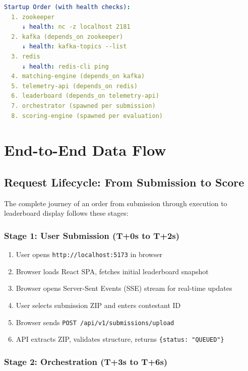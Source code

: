 \documentclass[10pt,a4paper,oneside]{report}
\begin{document}
\begin{lstlisting}[language=yaml]
Startup Order (with health checks):
  1. zookeeper
     ↓ health: nc -z localhost 2181
  2. kafka (depends_on zookeeper)
     ↓ health: kafka-topics --list
  3. redis
     ↓ health: redis-cli ping
  4. matching-engine (depends_on kafka)
  5. telemetry-api (depends_on redis)
  6. leaderboard (depends_on telemetry-api)
  7. orchestrator (spawned per submission)
  8. scoring-engine (spawned per evaluation)
\end{lstlisting}

\chapter{End-to-End Data Flow}

\section{Request Lifecycle: From Submission to Score}

The complete journey of an order from submission through execution to leaderboard display follows these stages:

\subsection{Stage 1: User Submission (T+0s to T+2s)}

\begin{enumerate}
    \item User opens \texttt{http://localhost:5173} in browser
    \item Browser loads React SPA, fetches initial leaderboard snapshot
    \item Browser opens Server-Sent Events (SSE) stream for real-time updates
    \item User selects submission ZIP and enters contestant ID
    \item Browser sends \texttt{POST /api/v1/submissions/upload}
    \item API extracts ZIP, validates structure, returns \texttt{\{status: "QUEUED"\}}
\end{enumerate}

\subsection{Stage 2: Orchestration (T+3s to T+6s)}
\end{document}
